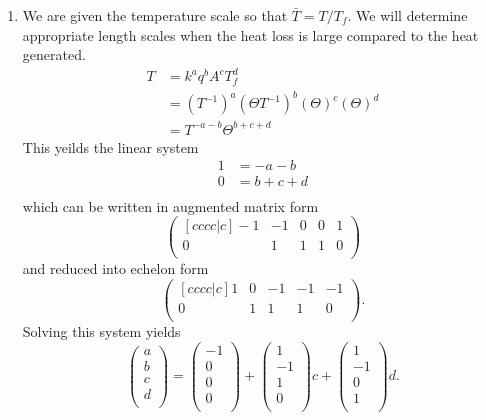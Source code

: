 \documentclass[12pt]{article}
\begin{document}
\begin{enumerate}
\item
  We are given the temperature scale so that $\bar{T}=T/T_f$. We will determine
  appropriate length scales when the heat loss is large compared to the heat
  generated.
  \begin{equation}
    \begin{aligned}
      T &= k^aq^bA^cT_f^d \\
      &= (T^{-1})^a(\Theta T^{-1})^b(\Theta)^c(\Theta)^d \\
      &= T^{-a-b}\Theta^{b+c+d}
    \end{aligned}
  \end{equation}
  This yeilds the linear system
  \begin{equation}
    \begin{aligned}
      1 &= -a - b \\
      0 &= b + c + d \\
    \end{aligned}
  \end{equation}
  which can be written in augmented matrix form
  \begin{equation}
    \begin{pmatrix}[cccc|c]
      -1 & -1 & 0 & 0 & 1 \\
      0 & 1 & 1 & 1 & 0 \\
    \end{pmatrix}
  \end{equation}
  and reduced into echelon form
  \begin{equation}
    \begin{pmatrix}[cccc|c]
      1 & 0 & -1 & -1 & -1 \\
      0 & 1 & 1 & 1 & 0 \\
    \end{pmatrix}.
  \end{equation}
  Solving this system yields
  \begin{equation}
    \begin{pmatrix}
      a \\ b \\ c \\ d \\
    \end{pmatrix} =
    \begin{pmatrix}
      -1 \\ 0 \\ 0 \\ 0 \\
    \end{pmatrix} +
    \begin{pmatrix}
      1 \\ -1 \\ 1 \\ 0 \\
    \end{pmatrix}c +
    \begin{pmatrix}
      1 \\ -1 \\ 0 \\ 1 \\
    \end{pmatrix}d.
  \end{equation}


\end{enumerate}
\end{document}
